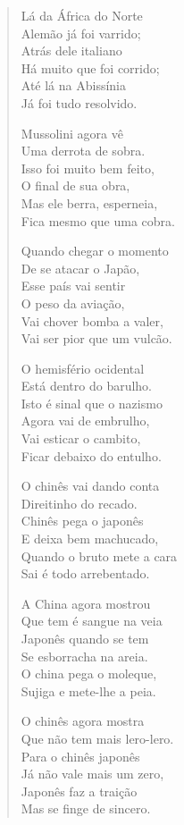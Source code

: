 \begin{verse}
Lá da África do Norte\\
Alemão já foi varrido;\\
Atrás dele italiano\\
Há muito que foi corrido;\\
Até lá na Abissínia\\
Já foi tudo resolvido.

Mussolini agora vê\\
Uma derrota de sobra.\\
Isso foi muito bem feito,\\
O final de sua obra,\\
Mas ele berra, esperneia,\\
Fica mesmo que uma cobra.

Quando chegar o momento\\
De se atacar o Japão,\\
Esse país vai sentir\\
O peso da aviação,\\
Vai chover bomba a valer,\\
Vai ser pior que um vulcão.

O hemisfério ocidental\\
Está dentro do barulho.\\
Isto é sinal que o nazismo\\
Agora vai de embrulho,\\
Vai esticar o cambito,\\
Ficar debaixo do entulho.
\pagebreak

O chinês vai dando conta\\
Direitinho do recado.\\
Chinês pega o japonês\\
E deixa bem machucado,\\
Quando o bruto mete a cara\\
Sai é todo arrebentado.

A China agora mostrou\\
Que tem é sangue na veia\\
Japonês quando se tem\\
Se esborracha na areia.\\
O china pega o moleque,\\
Sujiga e mete-lhe a peia.

O chinês agora mostra\\
Que não tem mais lero-lero.\\
Para o chinês japonês\\
Já não vale mais um zero,\\
Japonês faz a traição\\
Mas se finge de sincero.


\end{verse}
